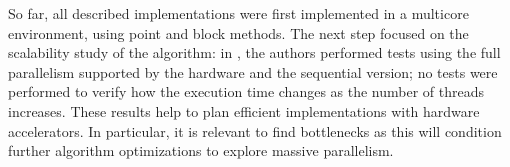 
So far, all described implementations were first implemented in a multicore environment, using point and block methods. The next step focused on the scalability study of the algorithm: in \cite{Deadman:Higham:Ralha:2013}, the authors performed tests using the full parallelism supported by the hardware and the sequential version; no tests were performed to verify how the execution time changes as the number of threads increases.
These results help to plan efficient implementations with hardware accelerators. In particular, it is relevant to find bottlenecks as this will condition further algorithm optimizations to explore massive parallelism.

